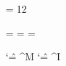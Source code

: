\chardef\other = 12
\def\makeactive#1{\catcode`#1 = \active\ignorespaces}
\def\uncatcodespecials{\def\do##1{\catcode`##1 = \other}\dospecials}
\def\removelastbox{\setbox0 = \lastbox}

\def\newline{\endgraf\noindent}                %
{\obeyspaces\gdef\tabtospaces{\ \ \ }}    %

\newtoks\everyverbatimbegin\everyverbatimbegin = {\relax}           %
\newtoks\everyverbatimend\everyverbatimend = {\relax}               %
\newskip\verbatimbaselineskip\verbatimbaselineskip = \baselineskip  %
\let\verbatimfont = \tt                                             % (modificabile)

\bgroup          %
    \makeactive\^^M \makeactive\^^I %
    \gdef\setupverbatim{%
        \makeactive\^^M \let^^M = \newline                       %
        \makeactive\^^I \let^^I = \tabtospaces            %
        \catcode`\@ = 0 \uncatcodespecials                       %
        \parskip = 0pt \baselineskip = \verbatimbaselineskip            %
        \obeyspaces\frenchspacing}                             %
\egroup
\def\@{@}              %

\def\verbatim{\endgraf\bgroup\the\everyverbatimbegin\setupverbatim\verbatimfont}
\def\endverbatim{\egroup\removelastbox\endgraf{\the\everyverbatimend}}
